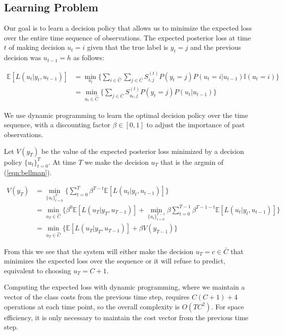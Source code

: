 \documentclass[12pt,solutions]{article}
\newcommand{\I}{\mathbb{I}}
\newcommand{\E}{\mathbb{E}}
\begin{document}
\subsection{Learning Problem}
Our goal is to learn a decision policy that allows us to minimize the expected loss over the entire time sequence of observations.
The expected posterior loss at time $t$ of making decision $u_t=i$ given that the true label is $y_t=j$ and the previous decision was $u_{t-1}=h$ as follows:

\begin{align}
\E[L(u_t|y_t, u_{t-1})] &= \min_{u_t} \Big\{ \sum_{i \in \hat{C}} \sum_{j \in \bar{C}} S_{i,j}^{(t)} P(y_t=j)P(u_t=i|u_{t-1})\I(u_t=i)\Big\}\\
&= \min_{u_t \in \hat{C}} \Big\{ \sum_{j \in \bar{C}} S_{u_t,j}^{(t)} P(y_t=j)P(u_t|u_{t-1})\Big\}
\label{eqn:exploss}
\end{align}

We use dynamic programming to learn the optimal decision policy over the time sequence, with a discounting factor $\beta \in [0,1]$ to adjust the importance of past observations.

Let $V(y_T)$ be the value of the expected posterior loss minimized by a decision policy $\{u_t\}_{t=0}^{T}$. At time $T$ we make the decision $u_T$ that is the argmin of (\ref{eqn:bellman}).

\begin{align}
V(y_T) &= \min_{\{u_t\}_{t=0}^{T}} \Big\{ \sum_{t=0}^T \beta^{T-t}\E[L(u_t|y_t, u_{t-1})] \Big\}\\
&= \min_{u_T \in \hat{C}} \Big\{  \beta^{0}\E[L(u_T|y_T, u_{T-1})] + \min_{\{u_t\}_{t=0}^{T-1}} \beta \sum_{t=0}^{T-1} \beta^{T-1-t}\E[L(u_t|y_t, u_{t-1})] \Big\}\\
&= \min_{u_T \in \hat{C}} \Big\{  \E[L(u_T|y_T, u_{T-1})] + \beta V(y_{T-1})\Big\} \label{eqn:bellman}
\end{align}

From this we see that the system will either make the decision $u_T = c \in \bar{C}$ that minimizes the expected loss over the sequence or it will refuse to predict, equivalent to choosing $u_T = C+1$. 

Computing the expected loss with dynamic programming, where we maintain a vector of the class costs from the previous time step, requires $C(C+1)+4$ operations at each time point, so the overall complexity is $O(TC^2)$. For space efficiency, it is only necessary to maintain the cost vector from the previous time step.
\end{document}
